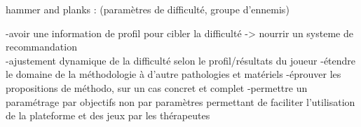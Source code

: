 	hammer and planks : (paramètres de difficulté, groupe d'ennemis)\newline
	
	-avoir une information de profil pour cibler la difficulté -> nourrir un systeme de recommandation\\
	-ajustement dynamique de la difficulté selon le profil/résultats du joueur\newline
	-étendre le domaine de la méthodologie à d'autre pathologies et matériels\newline
	-éprouver les propositions de méthodo, sur un cas concret et complet\newline
	-permettre un paramétrage par objectifs non par paramètres permettant de faciliter l'utilisation de la plateforme et des jeux par les thérapeutes
